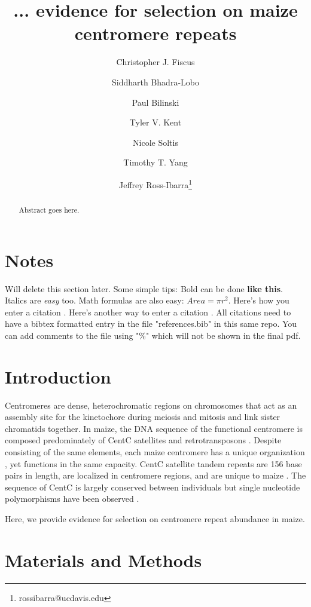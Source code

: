 \documentclass[12pt]{article}
\title{... evidence for selection on maize centromere repeats}
\author[1]{Christopher J. Fiscus}
\author[1]{Siddharth Bhadra-Lobo}
\author[1]{Paul Bilinski}
\author[1]{Tyler V. Kent}
\author[1]{Nicole Soltis}
\author[1]{Timothy T. Yang}
\author[1,2]{Jeffrey Ross-Ibarra\thanks{rossibarra@ucdavis.edu}}
\affil[1]{Department of Plant Sciences, University of California Davis}
\affil[2]{Center for Population Biology and Genome Center, University of California Davis}
\date{}
\begin{document}
\maketitle

\begin{abstract}
Abstract goes here.
\end{abstract}

\begin{footnotesize}
\end{footnotesize}

\section*{Notes}

Will delete this section later.  Some simple tips:
Bold can be done {\bf like this}.  Italics are \emph{easy} too.  Math formulas are also easy: $Area=\pi r^2$.
Here's how you enter a citation \cite{Wolfgruber2009}.
Here's another way to enter a citation \citep{Wolfgruber2009}.
All citations need to have a bibtex formatted entry in the file "references.bib" in this same repo. You can add comments to the file using "\%" which will not be shown in the final pdf.  

\section{Introduction}
Centromeres are dense, heterochromatic regions on chromosomes that act as an assembly site for the kinetochore during meiosis and mitosis and link sister chromatids together.  In maize, the DNA sequence of the functional centromere is composed predominately of CentC satellites and retrotransposons \cite{Nagaki2003}.  Despite consisting of the same elements, each maize centromere has a unique organization \cite{Ananiev1998}, yet functions in the same capacity.      
CentC satellite tandem repeats are 156 base pairs in length, are localized in centromere regions, and are unique to maize \cite{Ananiev1998}.  The sequence of CentC is largely conserved between individuals but single nucleotide polymorphisms have been observed \cite{Ananiev1998}.  


Here, we provide evidence for selection on centromere repeat abundance in maize. 

\section{Materials and Methods}
\end{document}
